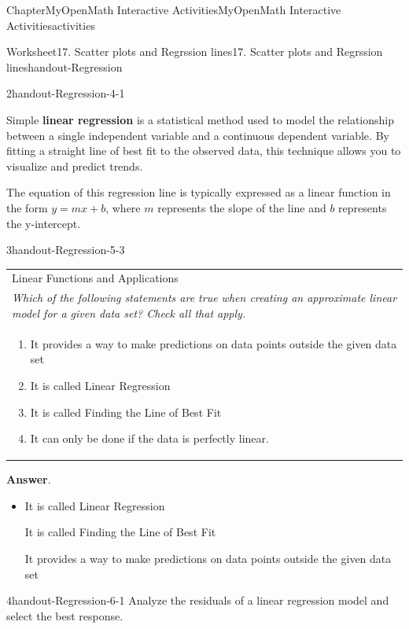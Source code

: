 \documentclass[oneside,10pt,]{book}
\newcommand{\blocktitlefont}{\relax}
\newcommand{\tabularfont}{\relax}
\newcommand{\ptxlistdisc}{\raisebox{0.3ex}{\textbullet}}
\newcommand{\terminology}[1]{\textbf{#1}}
\begin{document}
\begin{chapterptx}{Chapter}{MyOpenMath Interactive Activities}{}{MyOpenMath Interactive Activities}{}{}{activities}
\begin{worksheet-section}{Worksheet}{17. Scatter plots and Regrssion lines}{}{17. Scatter plots and Regrssion lines}{}{}{handout-Regression}
\begin{divisionexercise}{2}{}{}{handout-Regression-4-1}
%
\end{divisionexercise}%
\clearpage
Simple \terminology{linear regression} is a statistical method used to model the relationship between a single independent variable and a continuous dependent variable. By fitting a straight line of best fit to the observed data, this technique allows you to visualize and predict trends.%
\par
The equation of this regression line is typically expressed as a linear function in the form \(y = mx + b\), where \(m\) represents the slope of the line and \(b\) represents the y-intercept.%
\begin{divisionexercise}{3}{}{}{handout-Regression-5-3}%
\begin{center}%
{\tabularfont%
\begin{tabular}{l}
Linear Functions and Applications\tabularnewline[0pt]
\emph{Which of the following statements are true when creating an approximate linear model for a given data set?  Check all that apply.}\tabularnewline[0pt]
\multicolumn{1}{m{0.2\linewidth}}{\raggedright%
%
\begin{enumerate}[label={(\alph*)}]
\item{}It provides a way to make predictions on data points outside the given data set%
\item{}It is called Linear Regression%
\item{}It is called Finding the Line of Best Fit%
\item{}It can only be done if the data is perfectly linear.%
\end{enumerate}
%
}
\end{tabular}
}%
\end{center}%
\par\smallskip%
\noindent\textbf{\blocktitlefont Answer}.\hypertarget{handout-Regression-5-3-2}{}\quad{}%
\begin{itemize}[label=\ptxlistdisc]
\item{}It is called Linear Regression%
\par
It is called Finding the Line of Best Fit%
\par
It provides a way to make predictions on data points outside the given data set%
\end{itemize}
%
\end{divisionexercise}%
\clearpage
\begin{divisionexercise}{4}{}{}{handout-Regression-6-1}%
Analyze the residuals of a linear regression model and select the best response.%
\par

\end{divisionexercise}
\end{worksheet-section}
\end{chapterptx}
\end{document}
